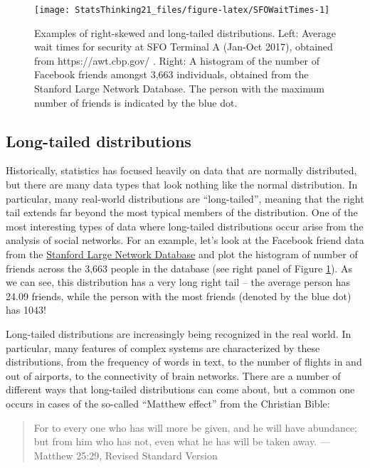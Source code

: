 \documentclass[]{book}
\theoremstyle{definition}
\theoremstyle{definition}
\theoremstyle{definition}
\theoremstyle{remark}
\begin{document}
\begin{figure}
\texttt{[image: StatsThinking21\_files/figure-latex/SFOWaitTimes-1]} \caption{Examples of right-skewed and long-tailed distributions.  Left: Average wait times for security at SFO Terminal A (Jan-Oct 2017), obtained from https://awt.cbp.gov/ .  Right: A histogram of the number of Facebook friends amongst 3,663 individuals, obtained from the Stanford Large Network Database. The person with the maximum number of friends is indicated by the blue dot.}\label{fig:SFOWaitTimes}
\end{figure}

\subsection{Long-tailed distributions}\label{long-tailed-distributions}

Historically, statistics has focused heavily on data that are normally
distributed, but there are many data types that look nothing like the
normal distribution. In particular, many real-world distributions are
``long-tailed'', meaning that the right tail extends far beyond the most
typical members of the distribution. One of the most interesting types
of data where long-tailed distributions occur arise from the analysis of
social networks. For an example, let's look at the Facebook friend data
from the
\href{https://snap.stanford.edu/data/egonets-Facebook.html}{Stanford
Large Network Database} and plot the histogram of number of friends
across the 3,663 people in the database (see right panel of Figure
\ref{fig:SFOWaitTimes}). As we can see, this distribution has a very
long right tail -- the average person has 24.09 friends, while the
person with the most friends (denoted by the blue dot) has 1043!

Long-tailed distributions are increasingly being recognized in the real
world. In particular, many features of complex systems are characterized
by these distributions, from the frequency of words in text, to the
number of flights in and out of airports, to the connectivity of brain
networks. There are a number of different ways that long-tailed
distributions can come about, but a common one occurs in cases of the
so-called ``Matthew effect'' from the Christian Bible:

\begin{quote}
For to every one who has will more be given, and he will have abundance;
but from him who has not, even what he has will be taken away. ---
Matthew 25:29, Revised Standard Version
\end{quote}
\end{document}
